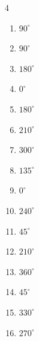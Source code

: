 \begin{multicols}{4}
\begin{enumerate}
  \item $\displaystyle 90^{\circ}$

  \item $\displaystyle 90^{\circ}$

  \item $\displaystyle 180^{\circ}$
        \phantom{$\displaystyle =\pi$}

  \item $\displaystyle 0^{\circ}$
        \phantom{$\displaystyle =0$}

  \item $\displaystyle 180^{\circ}$
        \phantom{$\displaystyle =\pi$}

  \item $\displaystyle 210^{\circ}$

  \item $\displaystyle 300^{\circ}$

  \item $\displaystyle 135^{\circ}$

  \item $\displaystyle 0^{\circ}$
        \phantom{$\displaystyle =0$}

  \item $\displaystyle 240^{\circ}$

  \item $\displaystyle 45^{\circ}$

  \item $\displaystyle 210^{\circ}$

  \item $\displaystyle 360^{\circ}$
        \phantom{$\displaystyle =2\pi$}

  \item $\displaystyle 45^{\circ}$

  \item $\displaystyle 330^{\circ}$

  \item $\displaystyle 270^{\circ}$


\end{enumerate}
\end{multicols}
